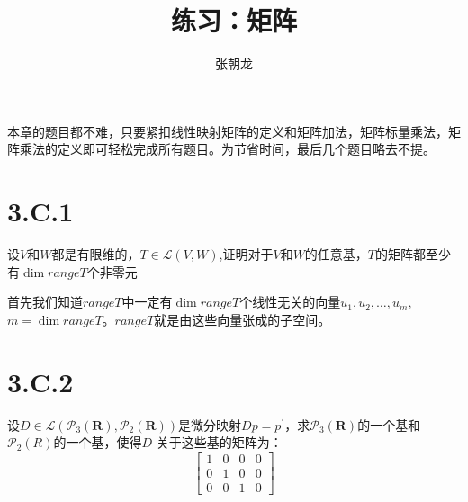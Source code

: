 \documentclass[10pt,a4paper,UTF8]{article}
\author{张朝龙}
\date{}
\title{练习：矩阵}
\begin{document}
\maketitle
\tableofcontents
{}
本章的题目都不难，只要紧扣线性映射矩阵的定义和矩阵加法，矩阵标量乘法，矩阵乘法的定义即可轻松完成所有题目。为节省时间，最后几个题目略去不提。

\section{3.C.1}
\label{sec:orgd0a8bba}


\begin{problem}
设\(V\)和\(W\)都是有限维的，\(T\in \mathcal{L}(V,W)\),证明对于\(V\)和\(W\)的任意基，\(T\)的矩阵都至少有\(\dim rangeT\)个非零元
\end{problem}

\begin{answer}
首先我们知道\(rangeT\)中一定有\(\dim rangeT\)个线性无关的向量\(u_{1},u_{2},\ldots ,u_{m}\), \(m = \dim rangeT\)。\(rangeT\)就是由这些向量张成的子空间。
\end{answer}
\section{3.C.2}
\label{sec:org988b892}


\begin{problem}
设\(D\in \mathcal{L}( \mathcal{P}_{3}( \mathbf{R}),\mathcal{P}_{2}(\mathbf{R}))\)是微分映射\(Dp = p^{'}\)，求\(\mathcal{P}_{3}( \mathbf{R})\)的一个基和\(\mathcal{P}_{2}(R)\)的一个基，使得\(D\) 关于这些基的矩阵为：
\begin{equation*}
\begin{bmatrix}
1 & 0 & 0 & 0 \\
0 & 1 & 0 & 0 \\
0 & 0 & 1 & 0
\end{bmatrix}
\end{equation*}
\end{problem}
\end{document}
